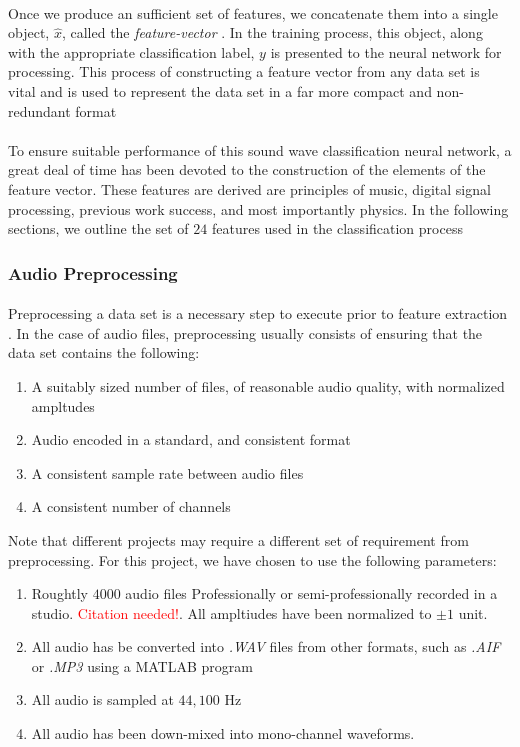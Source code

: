 \documentclass[12pt,letterpaper]{article}
\begin{document}
\paragraph*{}Once we produce an sufficient set of features, we concatenate them into a single object, $\hat{x}$, called the \textit{feature-vector} \cite{Goodfellow}. In the training process, this object, along with the appropriate classification label, $y$ is presented to the neural network for processing. This process of constructing a feature vector from any data set is vital and is used to represent the data set in a far more compact and non-redundant format \cite{Virtanen,Liu}

\paragraph*{}To ensure suitable performance of this sound wave classification neural network, a great deal of time has been devoted to the construction of the elements of the feature vector. These features are derived are principles of music, digital signal processing, previous work success, and most importantly physics. In the following sections, we outline the set of $24$ features used in the classification process

\subsubsection{Audio Preprocessing}

\paragraph*{}Preprocessing a data set is a necessary step to execute prior to feature extraction \cite{Geron2,James}. In the case of audio files, preprocessing usually consists of ensuring that the data set contains the following:
\begin{enumerate}
\item A suitably sized number of files, of reasonable audio quality, with normalized ampltudes
\item Audio encoded in a standard, and consistent format
\item A consistent sample rate between audio files
\item A consistent number of channels
\end{enumerate}
Note that different projects may require a different set of requirement from preprocessing\cite{Virtanen}. For this project, we have chosen to use the following parameters:
\begin{enumerate}
\item Roughtly $4000$ audio files Professionally or semi-professionally recorded in a studio. \textcolor{red}{Citation needed!}. All ampltiudes have been normalized to $\pm 1$ unit.
\item All audio has be converted into \textit{.WAV} files from other formats, such as \textit{.AIF} or \textit{.MP3} using a MATLAB program
\item All audio is sampled at $44,100$ Hz
\item All audio has been down-mixed into mono-channel waveforms.
\end{enumerate}
\end{document}
